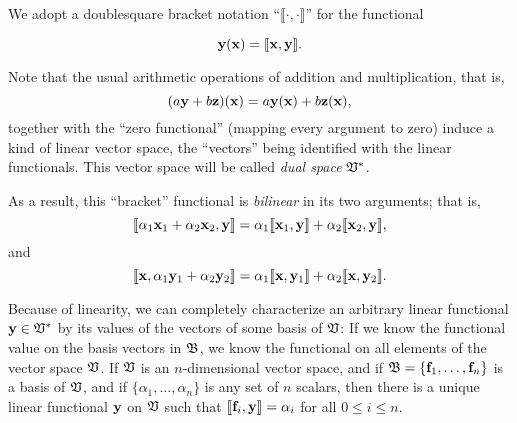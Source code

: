 We adopt a doublesquare bracket notation ``$\llbracket \cdot , \cdot \rrbracket$''
for the functional


\begin{equation}
{\bf y} ({\bf x})
=
\llbracket {\bf x},{\bf y}\rrbracket .
\end{equation}

Note that the usual arithmetic operations of addition and multiplication,
that is,
\begin{equation}
(a {\bf y} + b {\bf z}) ({\bf x})
=
a {\bf y} ({\bf x}) + b {\bf z} ({\bf x}) ,
\end{equation}
together with the ``zero functional''
(mapping every argument to zero)
induce a kind of linear vector space, the ``vectors''
being identified with the linear functionals.
This vector space will be called {\em dual space} ${\frak V}^\ast $.


As a result, this ``bracket'' functional is
{\em bilinear} in its two arguments; that is,
\begin{equation}
\llbracket  \alpha_1 {\bf x}_1 +\alpha_2 {\bf x}_2, {\bf y}\rrbracket
=
\alpha_1 \llbracket {\bf x}_1 ,{\bf y}\rrbracket   +\alpha_2  \llbracket {\bf x}_2,{\bf y}\rrbracket ,
\end{equation}
and
\begin{equation}
\llbracket
{\bf x}, \alpha_1 {\bf y}_1 +\alpha_2 {\bf y}_2
\rrbracket
=
\alpha_1
\llbracket {\bf x},{\bf y}_1 \rrbracket
+
\alpha_2
\llbracket {\bf x},{\bf y}_2\rrbracket .
\end{equation}


Because of linearity, we can completely characterize an arbitrary linear functional
${\bf y} \in {\frak V}^\ast $ by its values of the vectors of some basis of ${\frak V}$:
If we know the functional value on the basis vectors in ${\frak B}$, we know the functional
on all elements of the vector space ${\frak V}$.
If ${\frak V}$ is an $n$-dimensional vector space, and if ${\frak B} = \{{\bf f}_1,\ldots , {\bf f}_n\}$
is a basis of  ${\frak V}$, and if
$\{\alpha_1, \ldots ,\alpha_n\}$  is any set of $n$ scalars, then there is
a unique linear functional ${\bf y}$  on  ${\frak V}$ such that
$ \llbracket  {\bf f}_i, {\bf y}\rrbracket  = \alpha_i $ for all $0\le i \le n$.

